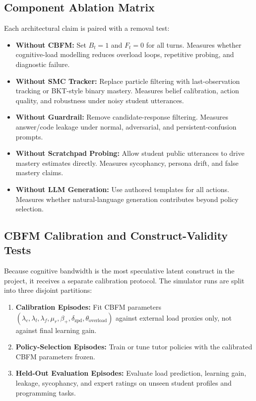\documentclass[11pt,a4paper]{report}
\begin{document}
\subsection{Component Ablation Matrix}
Each architectural claim is paired with a removal test:
\begin{itemize}
    \item \textbf{Without CBFM:} Set $B_t=1$ and $F_t=0$ for all turns. Measures whether cognitive-load modelling reduces overload loops, repetitive probing, and diagnostic failure.
    \item \textbf{Without SMC Tracker:} Replace particle filtering with last-observation tracking or BKT-style binary mastery. Measures belief calibration, action quality, and robustness under noisy student utterances.
    \item \textbf{Without Guardrail:} Remove candidate-response filtering. Measures answer/code leakage under normal, adversarial, and persistent-confusion prompts.
    \item \textbf{Without Scratchpad Probing:} Allow student public utterances to drive mastery estimates directly. Measures sycophancy, persona drift, and false mastery claims.
    \item \textbf{Without LLM Generation:} Use authored templates for all actions. Measures whether natural-language generation contributes beyond policy selection.
\end{itemize}

\subsection{CBFM Calibration and Construct-Validity Tests}
Because cognitive bandwidth is the most speculative latent construct in the project, it receives a separate calibration protocol. The simulator runs are split into three disjoint partitions:
\begin{enumerate}
    \item \textbf{Calibration Episodes:} Fit CBFM parameters $(\lambda_c,\lambda_l,\lambda_f,\mu_r,\beta_+,\delta_{\text{zpd}},\theta_{\text{overload}})$ against external load proxies only, not against final learning gain.
    \item \textbf{Policy-Selection Episodes:} Train or tune tutor policies with the calibrated CBFM parameters frozen.
    \item \textbf{Held-Out Evaluation Episodes:} Evaluate load prediction, learning gain, leakage, sycophancy, and expert ratings on unseen student profiles and programming tasks.
\end{enumerate}
\end{document}
